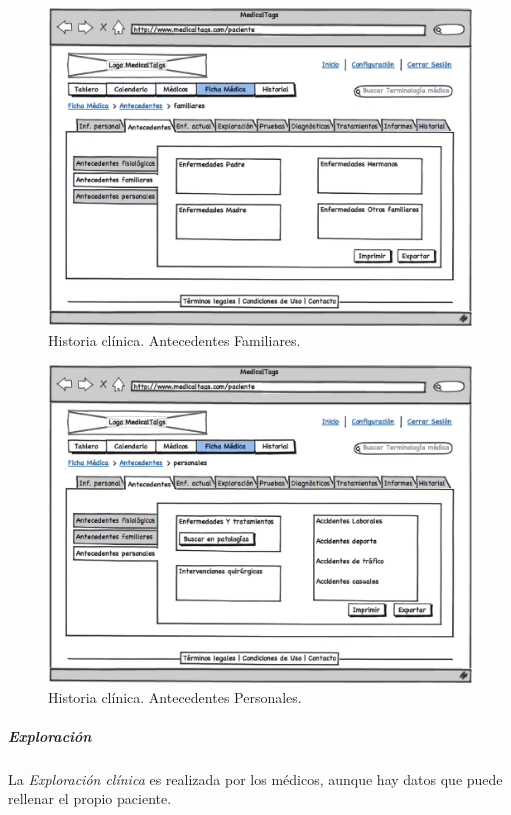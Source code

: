 \documentclass[a4paper,oneside,11pt]{book}
\begin{document}
			\begin{figure}[H]
			  \centering
			    \includegraphics[width=12cm]{img/eps/31_Antecedentes_pacientes1.eps}
			  \caption{Historia clínica. Antecedentes Familiares.}
			  \label{fig:antecedentes_familiares}
			\end{figure}
			
			\begin{figure}[H]
			  \centering
			    \includegraphics[width=12cm]{img/eps/32_Antecedentes_pacientes2.eps}
			  \caption{Historia clínica. Antecedentes Personales.}
			  \label{fig:antecedentes_personales}
			\end{figure}
			
		
		\subparagraph{Exploración} %
		\label{par:exploracion}
		
			La \textit{Exploración clínica} es realizada por los médicos, aunque hay datos que puede rellenar el propio paciente. 
			
\end{document}
